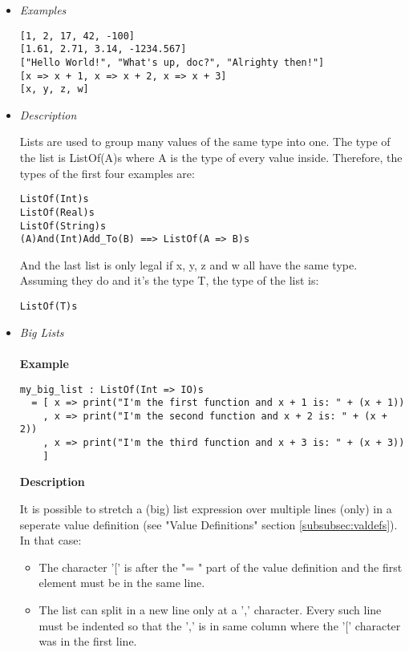 \documentclass{article}
\begin{document}
\begin{itemize}

\item \textit{Examples}
\begin{verbatim}
[1, 2, 17, 42, -100]
[1.61, 2.71, 3.14, -1234.567]
["Hello World!", "What's up, doc?", "Alrighty then!"]
[x => x + 1, x => x + 2, x => x + 3]
[x, y, z, w]
\end{verbatim}

\item \textit{Description}

Lists are used to group many values of the same type into one. 
The type of the list is ListOf(A)s where A is the type of every value inside.
Therefore, the types of the first four examples are:
\begin{verbatim}
ListOf(Int)s
ListOf(Real)s
ListOf(String)s
(A)And(Int)Add_To(B) ==> ListOf(A => B)s
\end{verbatim}
And the last list is only legal if x, y, z and w all have the same type. Assuming 
they do and it's the type T, the type of the list is: 
\begin{verbatim}
ListOf(T)s
\end{verbatim}

\item \textit{Big Lists}
  \\\\
  \textbf{Example}

  \begin{verbatim}
my_big_list : ListOf(Int => IO)s
  = [ x => print("I'm the first function and x + 1 is: " + (x + 1))
    , x => print("I'm the second function and x + 2 is: " + (x + 2))
    , x => print("I'm the third function and x + 3 is: " + (x + 3))
    ]
  \end{verbatim}

  \textbf{Description} 

  It is possible to stretch a (big) list expression over multiple lines (only) in
  a seperate value definition (see "Value Definitions" section
  \ref{subsubsec:valdefs}).  In that case:
  \begin{itemize}
  \item
  The character '[' is after the "= " part of the value definition
  and the first element must be in the same line.

  \item
  The list can split in a new line only at a ',' character. Every such line must
  be indented so that the ',' is in same column where the '[' character was in
  the first line.


\end{itemize}
\end{itemize}
\end{document}

